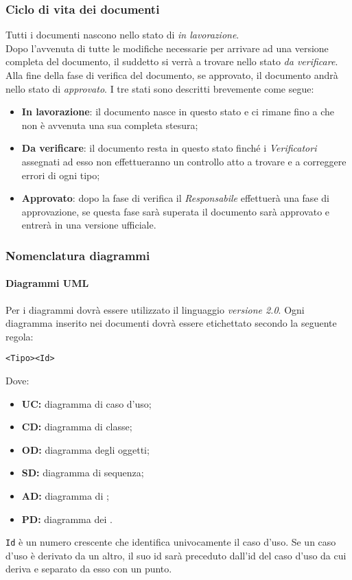 \documentclass{scalatekids-article}
\begin{document}
\subsubsection{Ciclo di vita dei documenti}
Tutti i documenti nascono nello stato di \textit{in lavorazione}.\\
Dopo l'avvenuta di tutte le modifiche necessarie per arrivare ad una versione completa del documento, il suddetto si verrà a trovare nello stato \textit{da verificare}.\\
Alla fine della fase di verifica del documento, se approvato, il documento andrà nello stato di \textit{approvato}.
I tre stati sono descritti brevemente come segue:
\begin{itemize}
\item \textbf{In lavorazione}: il documento nasce in questo stato e ci rimane fino a che non è avvenuta una sua completa stesura;
\item \textbf{Da verificare}: il documento resta in questo stato finché i \textit{Verificatori} assegnati ad esso non effettueranno un controllo atto a trovare e a correggere errori di ogni tipo;
\item \textbf{Approvato}: dopo la fase di verifica il \textit{Responsabile} effettuerà una fase di approvazione, se questa fase sarà superata il documento sarà approvato e entrerà in una versione ufficiale.
\end{itemize}

\subsubsection{Nomenclatura diagrammi}
\paragraph{Diagrammi UML}
Per i diagrammi dovrà essere utilizzato il linguaggio 
\textit{versione 2.0}. Ogni diagramma inserito nei documenti dovrà essere
etichettato secondo la seguente regola:
\begin{center}
  \verb=<Tipo><Id>=
\end{center}
Dove:
\begin{itemize}
\item\textbf{UC:} diagramma di caso d'uso;
\item\textbf{CD:} diagramma di classe;
\item\textbf{OD:} diagramma degli oggetti;
\item\textbf{SD:} diagramma di sequenza;
\item\textbf{AD:} diagramma di ;
\item\textbf{PD:} diagramma dei .
\end{itemize}
\verb=Id= è un numero crescente che identifica
univocamente il caso d'uso. Se un caso d'uso è derivato da un altro, il suo id
sarà preceduto dall'id del caso d'uso da cui deriva e separato da esso con un
punto.
\end{document}
